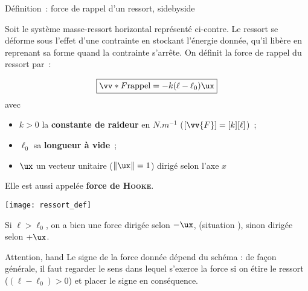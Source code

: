 \documentclass[../main/main.tex]{subfiles}
\begin{document}
\begin{tdefi}{Définition~: force de rappel d'un ressort, sidebyside}

    Soit le système masse-ressort horizontal représenté ci-contre. Le ressort se
    déforme sous l'effet d'une contrainte en stockant l'énergie donnée, qu'il
    libère en reprenant sa forme quand la contrainte s'arrête. On définit la
    force de rappel du ressort par~:

    \begin{equation*}
        \boxed{\vv*{F}{\rm rappel} = -k(\ell - \ell_0)\ux}
    \end{equation*}
    avec

    \begin{itemize}
        \item $k > 0$ la \textbf{constante de raideur} en $\si{N.m^{-1}}$
            ($[\vv{F}] = [k][\ell]$)~;
        \item $\ell_0$ sa \textbf{longueur à vide}~;
        \item $\ux$ un vecteur unitaire ($ \left\Vert \ux \right\Vert = 1$)
            dirigé selon l'axe $x$
    \end{itemize}

    \begin{center}
        Elle est aussi appelée \textbf{force de \textsc{Hooke}}.
    \end{center}

    \tcblower
    \begin{center}
        \texttt{[image: ressort\_def]}
    \end{center}

    Si $\ell > \ell_0$, on a bien une force dirigée selon $-\ux$, (situation
    ), sinon dirigée selon $+\ux$.

\end{tdefi}

\begin{tror}{Attention, hand}
    Le signe de la force donnée dépend du schéma : de façon générale, il faut
    regarder le sens dans lequel s’exerce la force si on étire le ressort ($(\ell
    - \ell_0) > 0$) et placer le signe en conséquence.
\end{tror}
\end{document}
